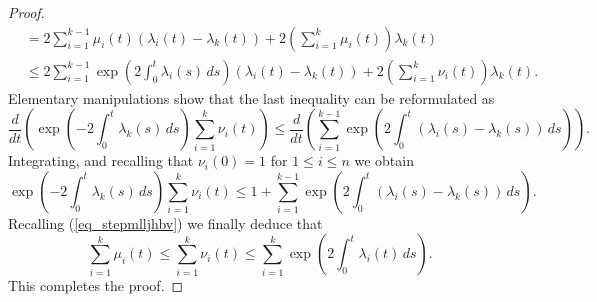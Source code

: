 \documentclass[10pt,a4paper]{amsart}
\begin{document}
\begin{proof}
\[\begin{split}
& = 2 \sum_{i=1}^{k-1} \mu_i (t) (\lambda_i (t) - \lambda_k (t) )
 + 2 \left( \sum_{i=1}^k \mu_i (t) \right) \lambda_k (t)  \\
& \leq 2 \sum_{i=1}^{k-1} \exp \left( 2 \int_0^t \lambda_i (s) \, ds \right)
 ( \lambda_i (t) - \lambda_k (t) ) + 2 \left( \sum_{i=1}^k \nu_i (t) \right) \lambda_k (t) .
\end{split}
\]
Elementary manipulations show that the last inequality can be reformulated
as
\[
\frac d{dt} \left( \exp \left( -2 \int_0^t \lambda_k (s) \, ds \right) \sum_{i=1}^k \nu_i (t) \right) \leq
\frac{d}{dt} \left( \sum_{i=1}^{k-1} \exp \left( 2 \int_0^t (\lambda_i (s) -\lambda_k (s)) \, ds \right) \right) .
\]
Integrating, and recalling that $\nu_i (0) = 1$ for  $1 \leq i\leq n$
we obtain 
\[
\exp \left( -2 \int_0^t \lambda_k (s) \, ds \right) \sum_{i=1}^k \nu_i (t)  \leq 1 +
\sum_{i=1}^{k-1} \exp \left( 2 \int_0^t (\lambda_i (s) -\lambda_k (s)) \, ds \right) .
\]
Recalling (\ref{eq_stepmlljhbv}) we finally deduce that 
\[
\sum_{i=1}^k \mu_i (t) \leq \sum_{i=1}^k \nu_i (t) \leq
\sum_{i=1}^k \exp \left( 2 \int_0^t \lambda_i (t) \, ds \right).
\]
This completes the proof.
\end{proof}
\end{document}
